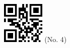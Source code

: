 \documentclass[twocolumn]{article}
\title{}
\date{}
\begin{document}

\begin{center}
 \hspace{0.2cm}
 \includegraphics[width=2cm]{qrcode-4.png}
 \hspace{0.5cm}
 \Large{  (No. 4) }
\end{center}


\end{document}
